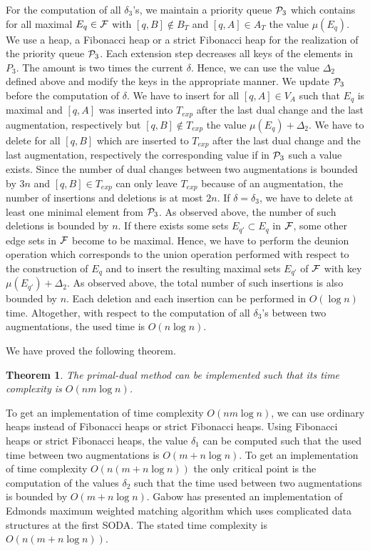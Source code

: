 \documentclass[12pt,twoside,a4paper]{article}
\newtheorem{theo}{Theorem}
\begin{document}
For the computation of all $\delta_3$'s, we maintain a priority queue 
${\cal P}_3$ which contains for all maximal $E_q \in \cal F$ with $[q,B] 
\not\in B_T$ and $[q,A] \in A_T$ the value $\mu(E_q)$.
We use a heap, a Fibonacci heap or a strict Fibonacci heap for the realization of 
the priority queue ${\cal P}_3$.
Each extension step decreases all keys of the elements in $P_3$. The amount
is two times the current $\delta$. Hence, we can use the value $\Delta_2$
defined above and modify the keys in the appropriate manner.
We update ${\cal P}_3$ before the computation of $\delta$. We have to insert 
for all $[q,A] \in V_A$ such that $E_q$ is maximal and $[q,A]$ was inserted 
into $T_{exp}$ after the last dual change and the last augmentation, respectively 
but $[q,B] \not\in T_{exp}$ the value $\mu(E_q) + \Delta_2$. 
We have to delete for all $[q,B]$ which are inserted to $T_{exp}$
after the last dual change and the last augmentation, respectively 
the corresponding value if in ${\cal P}_3$ such a value exists. 
Since the number of dual changes between two augmentations is bounded by $3n$ and
$[q,B] \in T_{exp}$ can only leave $T_{exp}$ because of an augmentation, the number
of insertions and deletions is at most $2n$. 
If $\delta = \delta_3$, we have to delete at least one minimal
element from ${\cal P}_3$. As observed above, the number of such deletions is
bounded by $n$. If there exists some sets $E_{q'} \subset E_q$ in $\cal F$,
some other edge sets in $\cal F$ become to be maximal. Hence, we have to perform
the deunion operation which corresponds to the union operation performed with
respect to the construction of $E_q$ and to insert the resulting maximal sets $E_{q'}$ of
$\cal F$ with key $\mu(E_{q'}) + \Delta_2$. As observed above, the total number of such 
insertions is also bounded by $n$. 
Each deletion and each insertion can be performed in $O(\log n)$ time.
Altogether, with respect to the computation of all $\delta_3$'s between two
augmentations, the used time is $O(n \log n)$.

We have proved the following theorem.
\begin{theo}
The primal-dual method can be implemented such that its time complexity is $O(nm \log n)$.
\end{theo}
To get an implementation of time complexity $O(nm \log n)$, we can use ordinary heaps
instead of Fibonacci heaps or strict Fibonacci heaps. Using Fibonacci heaps or strict
Fibonacci heaps, the value $\delta_1$ can be computed such that the used time between
two augmentations is $O(m + n \log n)$. To get an implementation of time complexity
$O(n(m + n \log n))$ the only critical point is the computation of the values $\delta_2$
such that the time used between two augmentations is bounded by $O(m + n \log n)$.
Gabow \cite{Ga2} has presented an implementation of Edmonds maximum weighted matching 
algorithm which uses complicated data structures at the first SODA. The stated time 
complexity is $O(n(m + n \log n))$.
\end{document}
